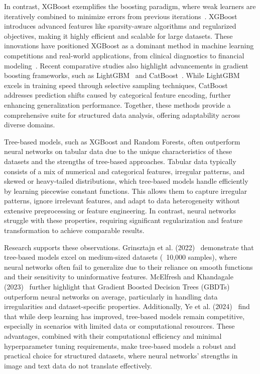 In contrast, XGBoost exemplifies the boosting paradigm, where weak learners are iteratively combined to minimize errors from previous iterations~\cite{Comparative_XGBoost}. XGBoost introduces advanced features like sparsity-aware algorithms and regularized objectives, making it highly efficient and scalable for large datasets. These innovations have positioned XGBoost as a dominant method in machine learning competitions and real-world applications, from clinical diagnostics to financial modeling~\cite{Yan_2020}. Recent comparative studies also highlight advancements in gradient boosting frameworks, such as LightGBM~\cite{LightGBM} and CatBoost~\cite{CatBoost}. While LightGBM excels in training speed through selective sampling techniques, CatBoost addresses prediction shifts caused by categorical feature encoding, further enhancing generalization performance. Together, these methods provide a comprehensive suite for structured data analysis, offering adaptability across diverse domains.

Tree-based models, such as XGBoost and Random Forests, often outperform neural networks on tabular data due to the unique characteristics of these datasets and the strengths of tree-based approaches. Tabular data typically consists of a mix of numerical and categorical features, irregular patterns, and skewed or heavy-tailed distributions, which tree-based models handle efficiently by learning piecewise constant functions. This allows them to capture irregular patterns, ignore irrelevant features, and adapt to data heterogeneity without extensive preprocessing or feature engineering. In contrast, neural networks struggle with these properties, requiring significant regularization and feature transformation to achieve comparable results.

Research supports these observations. Grinsztajn et al. (2022)~\cite{tree_based_model} demonstrate that tree-based models excel on medium-sized datasets (~10,000 samples), where neural networks often fail to generalize due to their reliance on smooth functions and their sensitivity to uninformative features. McElfresh and Khandagale (2023)~\cite{Outperform_Boosted_Trees} further highlight that Gradient Boosted Decision Trees (GBDTs) outperform neural networks on average, particularly in handling data irregularities and dataset-specific properties. Additionally, Ye et al. (2024)~\cite{Closer_Look} find that while deep learning has improved, tree-based models remain competitive, especially in scenarios with limited data or computational resources. These advantages, combined with their computational efficiency and minimal hyperparameter tuning requirements, make tree-based models a robust and practical choice for structured datasets, where neural networks' strengths in image and text data do not translate effectively.



